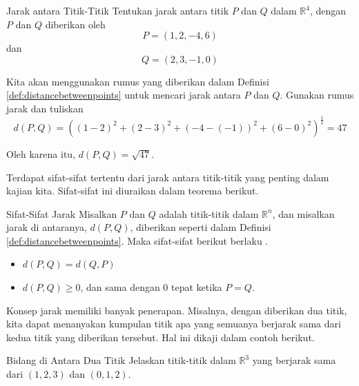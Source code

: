 \begin{example}{Jarak antara Titik-Titik}\label{exa:distancebetweenpoints}
Tentukan jarak antara titik $P$ dan $Q$ dalam $\mathbb{R}^{4}$,
dengan $P$ dan $Q$ diberikan oleh
\begin{equation*}
P=\left( 1,2,-4,6\right)
\end{equation*}
dan
\begin{equation*}
Q=\left( 2,3,-1,0\right)
\end{equation*}
\end{example}

\begin{solution}
Kita akan menggunakan rumus yang diberikan dalam Definisi \ref{def:distancebetweenpoints} untuk mencari jarak antara
$P$ dan $Q$.
Gunakan rumus jarak dan tuliskan
\begin{equation*}
d(P,Q)= \left( \left( 1-2\right) ^{2}+\left( 2-3\right)
^{2}+\left( -4-\left( -1\right) \right) ^{2}+\left( 6-0\right)^{2}\right) ^{\frac{1}{2}} = 47
\end{equation*}

Oleh karena itu, $d( P,Q) =
\sqrt{47}.$

\end{solution}

Terdapat sifat-sifat tertentu dari jarak antara titik-titik yang penting dalam kajian kita.
Sifat-sifat ini diuraikan dalam teorema berikut.

\begin{theorem}{Sifat-Sifat Jarak}\label{thm:distanceproperties}
Misalkan $P$ dan $Q$ adalah titik-titik dalam $\mathbb{R}^n$, dan misalkan jarak di antaranya,
$d( P, Q)$, diberikan seperti dalam Definisi \ref{def:distancebetweenpoints}.
Maka sifat-sifat berikut berlaku .
\begin{itemize}
\item $ d( P, Q) = d( Q, P)  $
\item $ d( P, Q) \geq 0$, dan sama dengan 0 tepat ketika $P = Q.$
\end{itemize}
\end{theorem}

Konsep jarak memiliki banyak penerapan. Misalnya,
dengan diberikan dua titik, kita dapat menanyakan kumpulan titik apa yang
semuanya berjarak sama dari kedua titik yang diberikan tersebut. Hal ini dikaji dalam
contoh berikut.

\begin{example}{Bidang di Antara Dua Titik}\label{exa:planebetweentwopoints}
Jelaskan titik-titik dalam $\mathbb{R}^3$ yang berjarak sama dari $\left(
1,2,3\right) $ dan $\left( 0,1,2\right) .$ 
\end{example}

